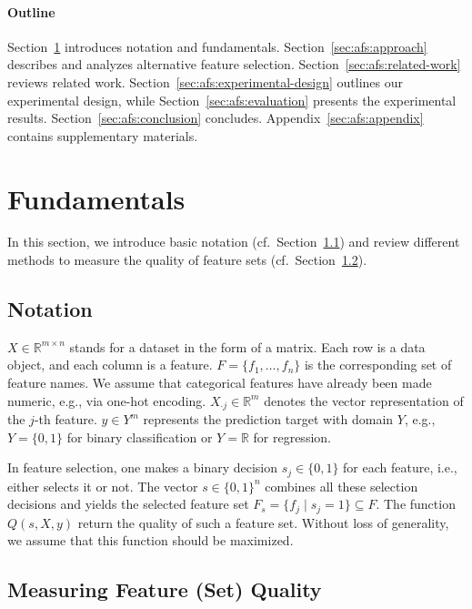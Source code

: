 \documentclass{article}
\theoremstyle{definition}
\begin{document}
\paragraph{Outline}

Section~\ref{sec:afs:fundamentals} introduces notation and fundamentals.
Section~\ref{sec:afs:approach} describes and analyzes alternative feature selection.
Section~\ref{sec:afs:related-work} reviews related work.
Section~\ref{sec:afs:experimental-design} outlines our experimental design, while Section~\ref{sec:afs:evaluation} presents the experimental results.
Section~\ref{sec:afs:conclusion} concludes.
Appendix~\ref{sec:afs:appendix} contains supplementary materials.

\section{Fundamentals}
\label{sec:afs:fundamentals}

In this section, we introduce basic notation (cf.~Section~\ref{sec:afs:fundamentals:notation}) and review different methods to measure the quality of feature sets  (cf.~Section~\ref{sec:afs:fundamentals:quality}).

\subsection{Notation}
\label{sec:afs:fundamentals:notation}

$X \in \mathbb{R}^{m \times n}$ stands for a dataset in the form of a matrix.
Each row is a data object, and each column is a feature.
$F = \{f_1, \dots, f_n\}$ is the corresponding set of feature names.
We assume that categorical features have already been made numeric, e.g., via one-hot encoding.
$X_{\cdot{}j} \in \mathbb{R}^m$ denotes the vector representation of the $j$-th feature.
$y \in Y^m$ represents the prediction target with domain $Y$, e.g., $Y=\{0,1\}$ for binary classification or $Y=\mathbb{R}$ for regression.

In feature selection, one makes a binary decision $s_j \in \{0,1\}$ for each feature, i.e., either selects it or not.
The vector $s \in \{0,1\}^n$ combines all these selection decisions and yields the selected feature set $F_s = \{f_j \mid s_j=1\} \subseteq F$.
The function $Q(s,X,y)$ return the quality of such a feature set.
Without loss of generality, we assume that this function should be maximized.

\subsection{Measuring Feature (Set) Quality}
\label{sec:afs:fundamentals:quality}
\end{document}
